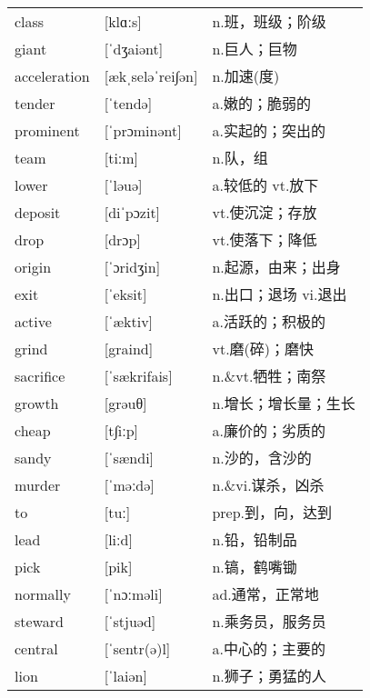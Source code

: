 \documentclass[a4paper]{article}
\begin{document}
\section{}
\begin{tabular}{l l l}

class & [klɑːs] & n.班，班级；阶级 \\
giant & [ˈdʒaiənt] & n.巨人；巨物 \\
acceleration & [ækˌseləˈrei∫ən] & n.加速(度) \\
tender & [ˈtendə] & a.嫩的；脆弱的 \\
prominent & [ˈprɔminənt] & a.实起的；突出的 \\
team & [tiːm] & n.队，组 \\
lower & [ˈləuə] & a.较低的 vt.放下 \\
deposit & [diˈpɔzit] & vt.使沉淀；存放 \\
drop & [drɔp] & vt.使落下；降低 \\
origin & [ˈɔridʒin] & n.起源，由来；出身 \\
exit & [ˈeksit] & n.出口；退场 vi.退出 \\
active & [ˈæktiv] & a.活跃的；积极的 \\
grind & [graind] & vt.磨(碎)；磨快 \\
sacrifice & [ˈsækrifais] & n.\&vt.牺牲；南祭 \\
growth & [grəuθ] & n.增长；增长量；生长 \\
cheap & [t∫iːp] & a.廉价的；劣质的 \\
sandy & [ˈsændi] & n.沙的，含沙的 \\
murder & [ˈməːdə] & n.\&vi.谋杀，凶杀 \\
to & [tuː] & prep.到，向，达到 \\
lead & [liːd] & n.铅，铅制品 \\
pick & [pik] & n.镐，鹤嘴锄 \\
normally & [ˈnɔːməli] & ad.通常，正常地 \\
steward & [ˈstjuəd] & n.乘务员，服务员 \\
central & [ˈsentr(ə)l] & a.中心的；主要的 \\
lion & [ˈlaiən] & n.狮子；勇猛的人 \\

\end{tabular}
\end{document}
